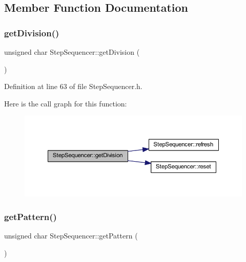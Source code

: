\subsection{Member Function Documentation}
\mbox{\label{class_step_sequencer_a06c5c7b852aee258ad8b245058cee6ad}} 
\subsubsection{\texorpdfstring{get\+Division()}{getDivision()}}
{\footnotesize\ttfamily unsigned char Step\+Sequencer\+::get\+Division (\begin{DoxyParamCaption}{ }\end{DoxyParamCaption})\hspace{0.3cm}{\ttfamily [inline]}}



Definition at line 63 of file Step\+Sequencer.\+h.

Here is the call graph for this function\+:
\nopagebreak
\begin{figure}[H]
\begin{center}
\leavevmode
\includegraphics[width=350pt]{dc/d87/class_step_sequencer_a06c5c7b852aee258ad8b245058cee6ad_cgraph}
\end{center}
\end{figure}
\mbox{\label{class_step_sequencer_a6c3987d5f4a966e8fcde3f7926aca54e}} 
\subsubsection{\texorpdfstring{get\+Pattern()}{getPattern()}}
{\footnotesize\ttfamily unsigned char Step\+Sequencer\+::get\+Pattern (\begin{DoxyParamCaption}{ }\end{DoxyParamCaption})\hspace{0.3cm}{\ttfamily [inline]}}



